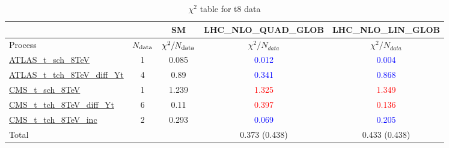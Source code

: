 \documentclass{article}
\begin{document}
\begin{table}[H]
\centering
\begin{tabular}{|l|c|c|c|c|}
\hline
 \multicolumn{2}{|c|}{} & SM& LHC_NLO_QUAD_GLOB& LHC_NLO_LIN_GLOB\\ \hline
Process & $N_{\rm data}$ & $\chi^ 2/N_{\rm data}$& $\chi^ 2/N_{data}$& $\chi^ 2/N_{data}$\\ \hline
\href{https://arxiv.org}{ATLAS_t_sch_8TeV} & 1 & 0.085 & \textcolor{blue}                            {0.012} & \textcolor{blue}                            {0.004} \\ \hline
\href{https://arxiv.org}{ATLAS_t_tch_8TeV_diff_Yt} & 4 & 0.89 & \textcolor{blue}                            {0.341} & \textcolor{blue}                            {0.868} \\ \hline
\href{https://arxiv.org}{CMS_t_sch_8TeV} & 1 & 1.239 & \textcolor{red}                            {1.325} & \textcolor{red}                            {1.349} \\ \hline
\href{https://arxiv.org}{CMS_t_tch_8TeV_diff_Yt} & 6 & 0.11 & \textcolor{red}                            {0.397} & \textcolor{red}                            {0.136} \\ \hline
\href{https://arxiv.org}{CMS_t_tch_8TeV_inc} & 2 & 0.293 & \textcolor{blue}                            {0.069} & \textcolor{blue}                            {0.205} \\ \hline
\hline Total & &  & 0.373 (0.438) & 0.433 (0.438) \\ \hline
\end{tabular}
\caption{$\chi^2$ table for t8 data}
\end{table}
\end{document}
